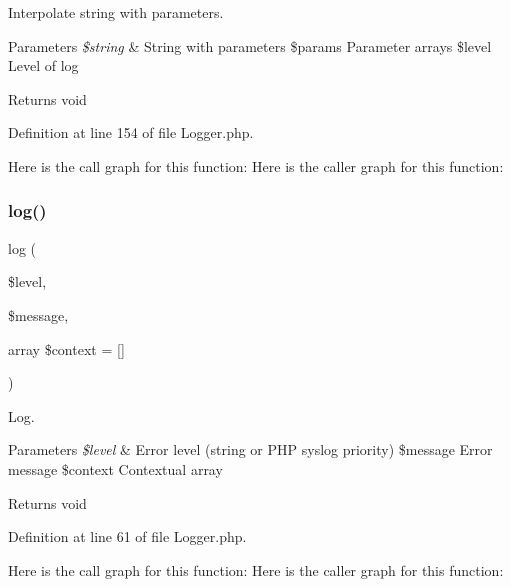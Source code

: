 Interpolate string with parameters.


\begin{DoxyParams}{Parameters}
{\em \$string} & String with parameters \$params Parameter arrays \$level Level of log\\
\hline
\end{DoxyParams}
\begin{DoxyReturn}{Returns}
void 
\end{DoxyReturn}


Definition at line 154 of file Logger.\+php.

Here is the call graph for this function\+:
Here is the caller graph for this function\+:
\mbox{\label{class_zest_1_1_common_1_1_logger_1_1_logger_ad320d8ce87763c6e2d94b69584ccae3f}} 
\subsubsection{\texorpdfstring{log()}{log()}}
{\footnotesize\ttfamily log (\begin{DoxyParamCaption}\item[{}]{\$level,  }\item[{}]{\$message,  }\item[{array}]{\$context = {\ttfamily \mbox{[}\mbox{]}} }\end{DoxyParamCaption})}

Log.


\begin{DoxyParams}{Parameters}
{\em \$level} & Error level (string or P\+HP syslog priority) \$message Error message \$context Contextual array\\
\hline
\end{DoxyParams}
\begin{DoxyReturn}{Returns}
void 
\end{DoxyReturn}


Definition at line 61 of file Logger.\+php.

Here is the call graph for this function\+:
Here is the caller graph for this function\+:
\mbox{\label{class_zest_1_1_common_1_1_logger_1_1_logger_aa29dd6a68594af040bbc3a809f110e02}} 

